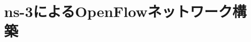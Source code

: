 \chapter{ns-3によるOpenFlowネットワーク構築}

\begin{comment}
　本節では，今回の研究で再現した来年度実装予定である次期EUNETの概要とns-3におけるネットワーク構築法，パラメータ設定に関して説明する．

\section{EUNET概要}

EUNETの構築に必要なのは愛媛大学の城北，重信，持田，樽見の各キャンパスとデータセンターを接続するネットワーク（以降「L3サブネット」）と
キャンパス内の建物同士を接続するネットワーク・建物内を網羅するネットワーク（以降「エッジネットワーク」）の二種類である．以降で詳細な説明と，各ネットワークの配置等の説明を行う．

EUNETにおけるネットワークの構築内容を図 \ref{EUNET構成図} で表し，エッジネットワークにおける機器の総数を表 \ref{各キャンパスのネットワーク機器数} に表す．

\begin{figure}[tb]
\begin{center}
\scalebox{0.7}{\texttt{[image: ネットワーク構成図.eps]}} 
\caption{EUNET構成図}
\label{EUNET構成図}
\end{center}
\end{figure}

\begin{table}[tb]
\begin{center}
\caption{各キャンパスのネットワーク機器数}
\label{各キャンパスのネットワーク機器数}
\begin{tabular}{c|c|c|c} 
\hline \hline
キャンパス名 & L3スイッチ & L2スイッチ & 無線アクセスポイント \\ 
\hline 
城北 & 26 & 180 & 167 \\
重信 & 12 & 90 & 60 \\
樽見 & 8 & 44 & 68 \\
持田 & 4 & 10 & 13 \\
\hline
\end{tabular}
\end{center}
\end{table}



\end{comment}
